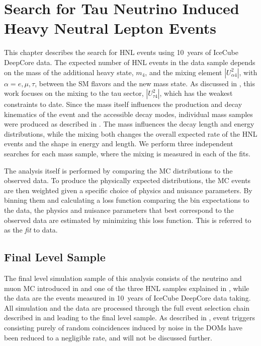\setchapterpreamble[u]{\margintoc}

\chapter{Search for Tau Neutrino Induced Heavy Neutral Lepton Events}

This chapter describes the search for HNL events using \SI{10}{years} of IceCube DeepCore data. The expected number of HNL events in the data sample depends on the mass of the additional heavy state, $m_4$, and the mixing element $|U_{\alpha4}^2|$, with $\alpha=e,\mu,\tau$, between the SM flavors and the new mass state. As discussed in , this work focuses on the mixing to the tau sector, $|U_{\tau4}^2|$, which has the weakest constraints to date. Since the mass itself influences the production and decay kinematics of the event and the accessible decay modes, individual mass samples were produced as described in . The mass influences the decay length and energy distributions, while the mixing both changes the overall expected rate of the HNL events and the shape in energy and length. We perform three independent searches for each mass sample, where the mixing is measured in each of the fits.

The analysis itself is performed by comparing the MC distributions to the observed data. To produce the  physically expected distributions, the MC events are then weighted given a specific choice of physics  and nuisance parameters. By binning them and calculating a loss function comparing the bin expectations to the data, the physics and nuisance parameters that best correspond to the observed data are estimated by minimizing this loss function. This is referred to as the \textit{fit} to data.


\section{Final Level Sample} 

The final level simulation sample of this analysis consists of the neutrino and muon MC introduced in  and one of the three HNL samples explained in , while the data are the events measured in \SI{10}{years} of IceCube DeepCore data taking. All simulation and the data are processed through the full event selection chain described in  and  leading to the final level sample. As described in , event triggers consisting purely of random coincidences induced by noise in the DOMs have been reduced to a negligible rate, and will not be discussed further.

